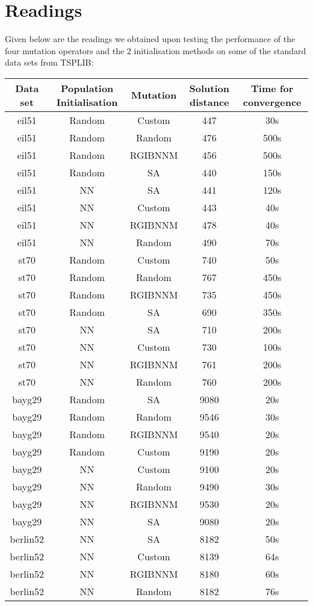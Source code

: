 \documentclass{article}
\begin{document}
\section{Readings}
Given below are the readings we obtained upon testing the performance of the four mutation operators and the 2 initialisation methods on some of the standard data sets from TSPLIB: 
\begin{center}
 \begin{tabular}{||c c c c c||} 
 \hline
 Data set & Population Initialisation & Mutation & Solution distance & Time for convergence\\ [0.5ex] 
 \hline\hline
 eil51 & Random & Custom & 447 & 30s\\ 
 \hline
 eil51 & Random & Random & 476 & 500s\\
 \hline
 eil51 & Random & RGIBNNM & 456 & 500s\\
 \hline
 eil51 & Random & SA & 440 & 150s\\
 \hline
 eil51 & NN & SA & 441 & 120s\\
 \hline
 eil51 & NN & Custom & 443 & 40s\\
 \hline
 eil51 & NN & RGIBNNM & 478 & 40s\\
 \hline
 eil51 & NN & Random & 490 & 70s\\
 \hline
 
 st70 & Random & Custom  & 740  & 50s\\ 
 \hline
 st70 & Random & Random & 767  & 450s\\
 \hline
 st70 & Random & RGIBNNM & 735  & 450s\\
 \hline
 st70 & Random & SA & 690 & 350s\\
 \hline
 st70 & NN & SA & 710  & 200s \\
 \hline
 st70 & NN & Custom & 730  & 100s\\
 \hline
 st70 & NN & RGIBNNM & 761 &200s \\
 \hline
 st70 & NN & Random & 760 & 200s\\
 \hline
 
 bayg29 & Random & SA & 9080 & 20s\\
 \hline
 bayg29 & Random & Random &9546  & 30s\\
 \hline
 bayg29 & Random & RGIBNNM &9540  & 20s\\
 \hline
 bayg29 & Random & Custom &9190  & 20s\\
 \hline
 bayg29 & NN & Custom & 9100 & 20s\\
 \hline
 bayg29 & NN & Random & 9490 & 30s\\
 \hline
 bayg29 & NN & RGIBNNM & 9530 & 20s\\
 \hline
 bayg29 & NN & SA & 9080 & 20s\\
 \hline
 berlin52 & NN & SA & 8182 & 50s\\
 \hline
 berlin52 & NN & Custom & 8139 & 64s\\
 \hline
 berlin52 & NN & RGIBNNM & 8180 & 60s\\
 \hline
 berlin52 & NN & Random & 8182 & 76s\\
 \hline


\end{tabular}
\end{center}
\end{document}
